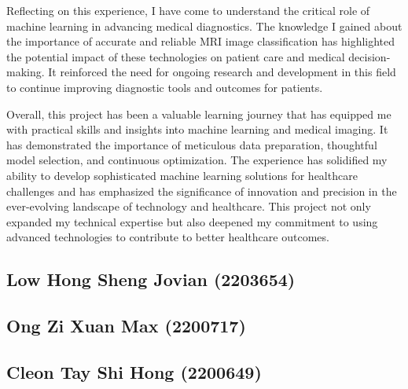 Reflecting on this experience, I have come to understand the critical role of machine learning in advancing medical diagnostics. The knowledge I gained about the importance of accurate and reliable MRI image classification has highlighted the potential impact of these technologies on patient care and medical decision-making. It reinforced the need for ongoing research and development in this field to continue improving diagnostic tools and outcomes for patients.

Overall, this project has been a valuable learning journey that has equipped me with practical skills and insights into machine learning and medical imaging. It has demonstrated the importance of meticulous data preparation, thoughtful model selection, and continuous optimization. The experience has solidified my ability to develop sophisticated machine learning solutions for healthcare challenges and has emphasized the significance of innovation and precision in the ever-evolving landscape of technology and healthcare. This project not only expanded my technical expertise but also deepened my commitment to using advanced technologies to contribute to better healthcare outcomes.

\subsection{Low Hong Sheng Jovian (2203654)}

\subsection{Ong Zi Xuan Max (2200717)}

\subsection{Cleon Tay Shi Hong (2200649)}
